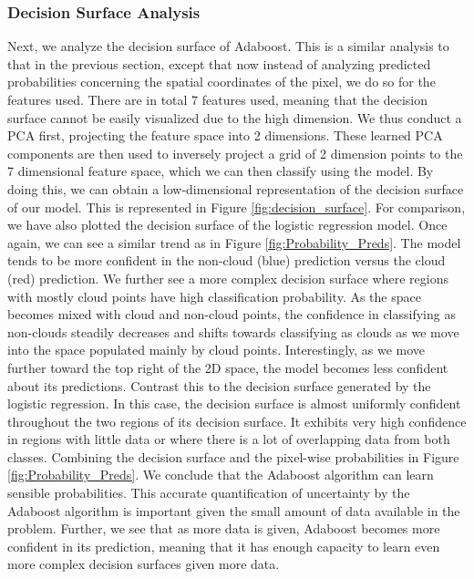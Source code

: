 \documentclass[11pt, letterpaper, journal]{IEEEtran}
\begin{document}
\subsubsection{Decision Surface Analysis}
Next, we analyze the decision surface of Adaboost. This is a similar analysis to that in the previous section, except that now instead of analyzing predicted probabilities concerning the spatial coordinates of the pixel, we do so for the features used. There are in total 7 features used, meaning that the decision surface cannot be easily visualized due to the high dimension. We thus conduct a PCA first, projecting the feature space into 2 dimensions. These learned PCA components are then used to inversely project a grid of 2 dimension points to the 7 dimensional feature space, which we can then classify using the model. By doing this, we can obtain a low-dimensional representation of the decision surface of our model. This is represented in Figure \ref{fig:decision_surface}. For comparison, we have also plotted the decision surface of the logistic regression model. Once again, we can see a similar trend as in Figure \ref{fig:Probability_Preds}. The model tends to be more confident in the non-cloud (blue) prediction versus the cloud (red) prediction. We further see a more complex decision surface where regions with mostly cloud points have high classification probability. As the space becomes mixed with cloud and non-cloud points, the confidence in classifying as non-clouds steadily decreases and shifts towards classifying as clouds as we move into the space populated mainly by cloud points. Interestingly, as we move further toward the top right of the 2D space, the model becomes less confident about its predictions. Contrast this to the decision surface generated by the logistic regression. In this case, the decision surface is almost uniformly confident throughout the two regions of its decision surface. It exhibits very high confidence in regions with little data or where there is a lot of overlapping data from both classes. Combining the decision surface and the pixel-wise probabilities in Figure \ref{fig:Probability_Preds}. We conclude that the Adaboost algorithm can learn sensible probabilities. This accurate quantification of uncertainty by the Adaboost algorithm is important given the small amount of data available in the problem. Further, we see that as more data is given, Adaboost becomes more confident in its prediction, meaning that it has enough capacity to learn even more complex decision surfaces given more data.
\end{document}
